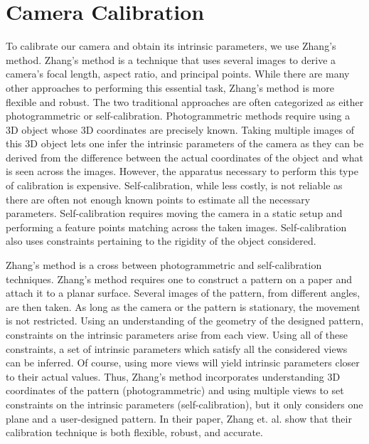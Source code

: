 \section{Camera Calibration}
\label{s:camera}

To calibrate our camera and obtain its intrinsic parameters, we use Zhang's method. 
Zhang's method is a technique that uses several images to derive a camera's focal length, aspect ratio, and principal points. While there are many other approaches to performing this essential task, Zhang's method is more flexible and robust. The two traditional approaches are often categorized as either photogrammetric or self-calibration. Photogrammetric methods require using a 3D object whose 3D coordinates are precisely known. Taking multiple images of this 3D object lets one infer the intrinsic parameters of the camera as they can be derived from the difference between the actual coordinates of the object and what is seen across the images. However, the apparatus necessary to perform this type of calibration is expensive. Self-calibration, while less costly, is not reliable as there are often not enough known points to estimate all the necessary parameters. Self-calibration requires moving the camera in a static setup and performing a feature points matching across the taken images. Self-calibration also uses constraints pertaining to the rigidity of the object considered.

Zhang's method is a cross between photogrammetric and self-calibration techniques. Zhang's method requires one to construct a pattern on a paper and attach it to a planar surface. Several images of the pattern, from different angles, are then taken. As long as the camera or the pattern is stationary, the movement is not restricted. Using an understanding of the geometry of the designed pattern, constraints on the intrinsic parameters arise from each view. Using all of these constraints, a set of intrinsic parameters which satisfy all the considered views can be inferred. Of course, using more views will yield intrinsic parameters closer to their actual values. Thus, Zhang’s method incorporates understanding 3D coordinates of the pattern  (photogrammetric) and using multiple views to set constraints on the intrinsic parameters (self-calibration), but it only considers one plane and a user-designed pattern. In their paper, Zhang et. al. show that their calibration technique is both flexible, robust, and accurate. 

